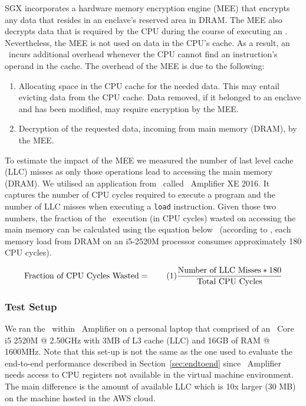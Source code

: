 \documentclass[../../../main.tex]{subfiles}
\newcommand\numberthis{\addtocounter{equation}{1}\tag{\theequation}}
\begin{document}
\label{sec:mem-analysis}
SGX incorporates a hardware memory encryption engine (MEE) that
encrypts any data that resides in an enclave's reserved area in DRAM.
The MEE also decrypts data that is required by the CPU during the
course of executing an \enclaveprogram. Nevertheless, the MEE is not
used on data in the CPU's cache. As a result, an
\enclaveprogram~incurs additional overhead whenever the CPU cannot
find an instruction's operand in the cache. The overhead of the MEE is
due to the following:
\begin{enumerate}
  \item Allocating space in the CPU cache for the needed data. This
    may entail evicting data from the CPU cache. Data removed, if it
    belonged to an enclave and has been modified, may require encryption
    by the MEE.
  \item Decryption of the requested data, incoming from main memory
    (DRAM), by the MEE.
\end{enumerate}

To estimate the impact of the MEE we measured the number of last level
cache (LLC) misses as only those operations lead to accessing the main
memory (DRAM). We utilised an application from \Intel~called
\VTune~Amplifier XE 2016. It captures the number of CPU cycles
required to execute a program and the number of LLC misses when
executing a \texttt{load} instruction. Given those two numbers, the
fraction of the \enclaveprogram~execution (in CPU cycles) wasted on
accessing the main memory can be calculated using the equation
below~\cite{intel-eqn} (according to \Intel, each memory load from DRAM
on an i5-2520M processor consumes approximately 180 CPU cycles).

\begin{align*}
  \text{Fraction of CPU Cycles Wasted} = \numberthis \label{eqn1}
  \frac{\text{Number of LLC Misses} * 180} 
  {\text{Total CPU Cycles}}
\end{align*}


\subsubsection*{Test Setup}
We ran the \enclavemodel~within \VTune~Amplifier on a personal laptop
that comprised of an \Intel~Core i5 2520M @ 2.50GHz with 3MB of L3
cache (LLC) and 16GB of RAM @ 1600MHz. Note that this set-up is not
the same as the one used to evaluate the end-to-end performance
described in Section~\ref{sec:endtoend} since \VTune~Amplifier needs
access to CPU registers not available in the virtual machine
environment. The main difference is the amount of available LLC which
is 10x larger (30 MB) on the machine hosted in the AWS cloud.
\end{document}
